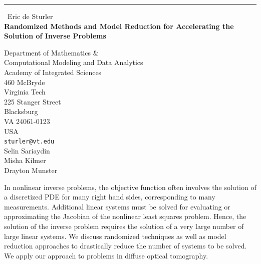 \documentclass{report}
\begin{document}
\begin{center}
\rule{6in}{1pt} \
{\large Eric de Sturler \\
{\bf Randomized Methods and Model Reduction for Accelerating the Solution of Inverse Problems}}

Department of Mathematics \& \\ Computational Modeling and Data Analytics \\ Academy of Integrated Sciences \\ 460 McBryde \\ Virginia Tech \\ 225 Stanger Street \\ Blacksburg \\ VA 24061-0123 \\ USA
\\
{\tt sturler@vt.edu}\\
Selin Sariaydin \\
Misha Kilmer\\
Drayton Munster\end{center}

In nonlinear inverse problems, the objective function often involves the
solution of a discretized PDE for many right hand sides, corresponding to
many measurements.
Additional linear systems must be solved for evaluating or approximating
the Jacobian of the nonlinear least squares problem. Hence, the solution
of the inverse problem
requires the solution of a very large number of large linear systems. We
discuss randomized techniques as well as model reduction approaches to
drastically reduce the number of systems to be solved. We apply our
approach to problems in diffuse optical tomography.
\end{document}
